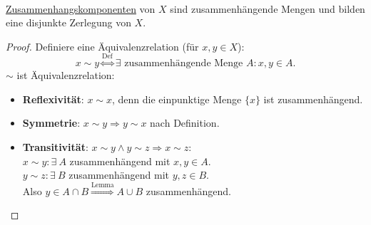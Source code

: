 \begin{remark}
  \  \\ \hyperref[def:zusammenhangskomponente]{Zusammenhangskomponenten} von \( X \) sind zusammenhängende Mengen und bilden eine disjunkte Zerlegung von \( X \).
  \begin{proof}
    Definiere eine Äquivalenzrelation (für \( x, y \in X \)):
    \begin{equation*}
      x \sim y \overset{\text{Def}}{\Leftrightarrow} \exists \text{ zusammenhängende Menge } A : x, y \in A\text{.}
    \end{equation*}
    \( \sim \) ist Äquivalenzrelation:
    \begin{itemize}
      \item \textbf{Reflexivität}: \( x \sim x \), denn die einpunktige Menge \( \{ x \} \) ist zusammenhängend. 
      \item \textbf{Symmetrie}: \( x \sim y \Rightarrow y \sim x \) nach Definition.
      \item \textbf{Transitivität}: \( x \sim y \wedge y \sim z \Rightarrow x \sim z \): \\
        \( x \sim y: \exists \ A \) zusammenhängend mit \( x,y \in A \). \\
        \( y \sim z: \exists \ B \) zusammenhängend mit \( y,z \in B \). \\
        Also \( y \in A \cap B \overset{\text{Lemma}}{\Rightarrow} A \cup B \) zusammenhängend.
    \end{itemize}
  \end{proof}
\end{remark}

